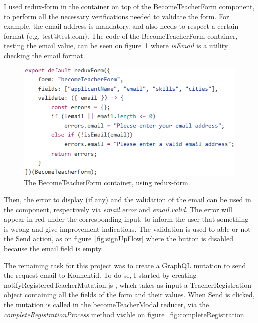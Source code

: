 I used redux-form in the container on top of the BecomeTeacherForm component, to perform all the necessary verifications needed to validate the form. For example, the email address is mandatory, and also needs to respect a certain format (e.g. test@test.com). The code of the BecomeTeacherForm container, testing the email value, can be seen on {\sc figure}~\ref{fig:reduxForm} where \textit{isEmail} is a utility checking the email format.

 \begin{figure}[H]
    \centering
    \includegraphics[scale=0.8]{figure/reduxForm.png}
    \caption{The BecomeTeacherForm container, using redux-form.}
    \label{fig:reduxForm}
\end{figure}

Then, the error to display (if any) and the validation of the email can be used in the component, respectively via \textit{email.error} and \textit{email.valid}. The error will appear in red under the corresponding input, to inform the user that something is wrong and give improvement indications. The validation is used to able or not the \guillemotleft{} Send \guillemotright{} action, as on {\sc figure}~\ref{fig:signUpFlow} where the button is disabled because the email field is empty.

The remaining task for this project was to create a GraphQL mutation to send the request email to Konnektid. To do so, I started by creating \guillemotleft{} notifyRegisteredTeacherMutation.js \guillemotright{}, which takes as input a \guillemotleft{} TeacherRegistration \guillemotright{} object containing all the fields of the form and their values. When \guillemotleft{} Send \guillemotright{} is clicked, the mutation is called in the \guillemotleft{} becomeTeacherModal \guillemotright{} reducer, via the \textit{completeRegistrationProcess} method visible on {\sc figure}~\ref{fig:completeRegistration}.

